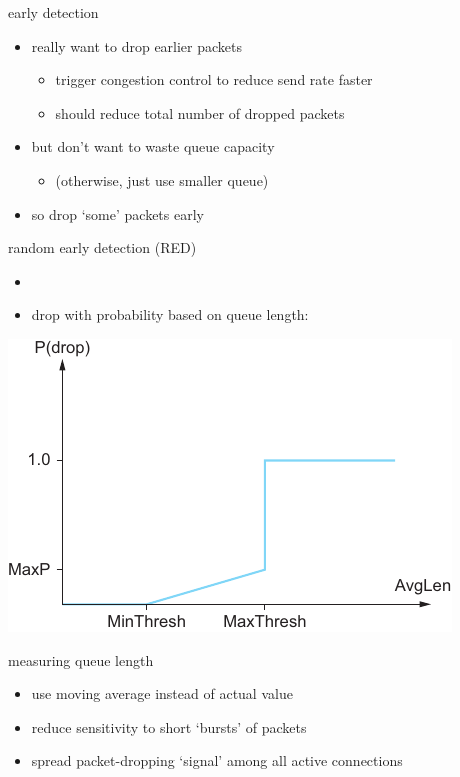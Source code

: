 \begin{frame}{early detection}
    \begin{itemize}
    \item really want to drop earlier packets
        \begin{itemize}
        \item trigger congestion control to reduce send rate faster
        \item should reduce total number of dropped packets
        \end{itemize}
    \item but don't want to waste queue capacity
        \begin{itemize}
        \item (otherwise, just use smaller queue)
        \end{itemize}
    \vspace{.5cm}
    \item so drop `some' packets early
    \end{itemize}
\end{frame}

\begin{frame}{random early detection (RED)}
    \begin{itemize}
    \item {}
    \item drop with probability based on queue length:
    \end{itemize}
\includegraphics[height=0.6\pageheight]{../queuing/sysapproach-6-4-fig169}
\end{frame}

\begin{frame}{measuring queue length}
    \begin{itemize}
    \item use moving average instead of actual value
    \vspace{.5cm}
    \item reduce sensitivity to short `bursts' of packets
    \item spread packet-dropping `signal' among all active connections
    \end{itemize}
\end{frame}
